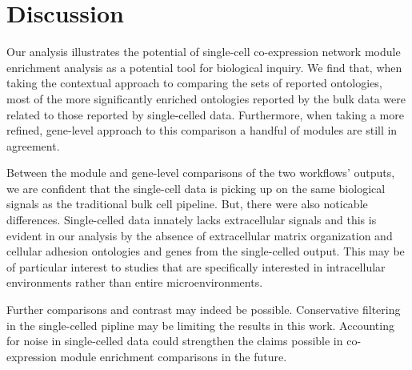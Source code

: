 \documentclass[10pt,letterpaper]{article}
\begin{document}
\section*{Discussion}

Our analysis illustrates the potential of single-cell co-expression network module enrichment analysis as a potential tool for biological inquiry. We find that, when taking the contextual approach to comparing the sets of reported ontologies, most of the more significantly enriched ontologies reported by the bulk data were related to those reported by single-celled data. Furthermore, when taking a more refined, gene-level approach to this comparison a handful of modules are still in agreement.

Between the module and gene-level comparisons of the two workflows' outputs, we are confident that the single-cell data is picking up on the same biological signals as the traditional bulk cell pipeline. But, there were also noticable differences. Single-celled data innately lacks extracellular signals and this is evident in our analysis by the absence of extracellular matrix organization and cellular adhesion ontologies and genes from the single-celled output. This may be of particular interest to studies that are specifically interested in intracellular environments rather than entire microenvironments.

Further comparisons and contrast may indeed be possible. Conservative filtering in the single-celled pipline may be limiting the results in this work. Accounting for noise in single-celled data could strengthen the claims possible in co-expression module enrichment comparisons in the future. 

\nolinenumbers


%
%
% 





\end{document}
